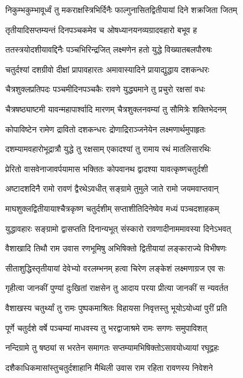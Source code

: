 \twolineshloka
{निकुम्भकुम्भावूर्ध्वं तु मकराक्षस्त्रिभिर्दिनैः}
{फाल्गुनासितद्वितीयायां दिने शक्रजिता जितम्}%

\twolineshloka
{तृतीयादिसप्तम्यन्तं दिनपञ्चकमेव च}
{ओषध्यानयनव्यग्रादवहारो बभूव ह}%

\twolineshloka
{ततस्त्रयोदशीयावद्दिनैः पञ्चभिरिन्द्रजित्}
{लक्ष्मणेन हतो युद्धे विख्यातबलपौरुषः}%

\twolineshloka
{चतुर्दश्यां दशग्रीवो दीक्षां प्रापावहारतः}
{अमावास्यादिने प्रायाद्युद्धाय दशकन्धरः}%

\twolineshloka
{चैत्रशुक्लप्रतिपदः पञ्चमीदिनपञ्चकैः}
{रावणे युद्ध्यमाने तु प्रचुरो रक्षसां वधः}%

\twolineshloka
{चैत्रषष्ठ्याष्टमी यावन्महापार्श्वादि मारणम्}
{चैत्रशुक्लनवम्यां तु सौमित्रेः शक्तिभेदनम्}%

\twolineshloka
{कोपाविष्टेन रामेण द्रावितो दशकन्धरः}
{द्रोणाद्रिराञ्जनेयेन लक्ष्मणार्थमुपाहृतः}%

\twolineshloka
{दशम्यामवहारोभूद्रात्रौ युद्धे तु रक्षसाम्}
{एकादश्यां तु रामाय रथं मातलिसारथिः}%

\twolineshloka
{प्रेरितो वासवेनाजावर्पयामास भक्तितः}
{कोपवानथ द्वादश्या यावत्कृष्णचतुर्दशी}%

\twolineshloka
{अष्टादशदिनै रामो रावणं द्वैरथेऽवधीत्}
{सङ्ग्रामे तुमुले जाते रामो जयमवाप्तवान्}%

\twolineshloka
{माघशुक्लद्वितीयायाश्चैत्रकृष्ण चतुर्दशीम्}
{सप्ताशीतिदिनेष्वेव मध्यं पञ्चदशाहकम्}%

\twolineshloka
{युद्धावहारः सङ्ग्रामो द्वासप्तति दिनान्यभूत्}
{संस्कारो रावणादीनाममावस्या दिनेऽभवत्}%

\twolineshloka
{वैशाखादि तिथौ राम उवास रणभूमिषु}
{अभिषिक्तो द्वितीयायां लङ्काराज्ये विभीषणः}%

\twolineshloka
{सीताशुद्धिस्तृतीयायां देवेभ्यो वरलम्भनम्}
{हत्वा चिरेण लङ्केशं लक्ष्मणाग्रज एव सः}%

\twolineshloka
{गृहीत्वा जानकीं पुण्यां दुःखितां राक्षसेन तु}
{आदाय परया प्रीत्या जानकीं स न्यवर्तत}%

\twolineshloka
{वैशाखस्य चतुर्थ्यां तु रामः पुष्पकमाश्रितः}
{विहायसा निवृत्तस्तु भूयोऽयोध्यां पुरीं प्रति}%

\twolineshloka
{पूर्णे चतुर्दशे वर्षे पञ्चम्यां माधवस्य तु}
{भरद्वाजाश्रमे रामः सगणः समुपाविशत्}%

\twolineshloka
{नन्दिग्रामे तु षष्ठ्यां स भरतेन समागतः}
{सप्तम्यामभिषिक्तोऽसावयोध्यायां रघूद्वहः}%

\twolineshloka
{दशैकाधिकमासांस्तुचतुर्दशाहानि मैथिली}
{उवास राम रहिता रावणस्य निवेशने}%

